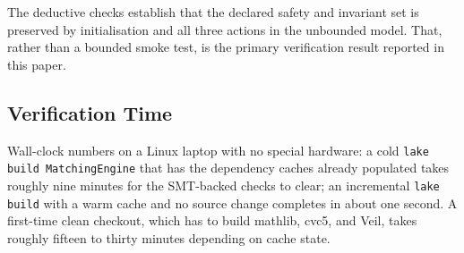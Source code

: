 The deductive checks establish that the declared safety and invariant set is
preserved by initialisation and all three actions in the unbounded model.
That, rather than a bounded smoke test, is the primary verification result
reported in this paper.

\subsection{Verification Time}

Wall-clock numbers on a Linux laptop with no special hardware: a cold
\texttt{lake build MatchingEngine} that has the dependency caches already
populated takes roughly nine minutes for the SMT-backed checks to clear; an
incremental \texttt{lake build} with a warm cache and no source change
completes in about one second. A first-time clean checkout, which has to
build mathlib, cvc5, and Veil, takes roughly fifteen to thirty minutes
depending on cache state.

